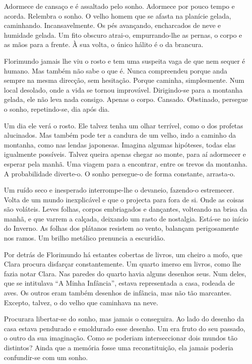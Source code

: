 Adormece de cansaço e é assaltado pelo sonho. Adormece por pouco tempo e
acorda. Relembra o sonho. O velho homem que se afasta na planície
gelada, caminhando. Incansavelmente. Os pés avançando, encharcados de
neve e humidade gelada. Um fito obscuro atrai-o, empurrando-lhe as
pernas, o corpo e as mãos para a frente. À sua volta, o único hálito é o
da brancura.

Florimundo jamais lhe viu o rosto e tem uma suspeita vaga de que nem
sequer é humano. Mas também não sabe o que é. Nunca compreendeu porque
anda sempre na mesma direcção, sem hesitação. Porque caminha,
simplesmente. Num local desolado, onde a vida se tornou improvável.
Dirigindo-se para a montanha gelada, ele não leva nada consigo. Apenas o
corpo. Cansado. Obstinado, persegue o sonho, repetindo-se, dia após dia.

Um dia ele verá o rosto. Ele talvez tenha um olhar terrível, como o dos
profetas alucinados. Mas também pode ter a candura de um velho, indo a
caminho da montanha, como nas lendas japonesas. Imagina algumas
hipóteses, todas elas igualmente possíveis. Talvez queira apenas chegar
ao monte, para aí adormecer e esperar pela manhã. Uma viagem para a
encontrar, entre os trevos da montanha. A probabilidade diverte-o. O
sonho persegue-o de forma constante, arrasta-o.

Um ruído seco e inesperado interrompe-lhe o devaneio, fazendo-o
estremecer. Volta de um mundo inexplicável e que o projecta para fora de
si. Onde as coisas são voláteis. Leves folhas, corpos embriagados e
dançantes, volteando na brisa da manhã, e que varrem a calçada, deixando
um rasto de nostalgia. Está-se no início do Inverno. As folhas dos
plátanos resistem ao vento, balançam perigosamente nos ramos. Um brilho
metálico prenuncia a escuridão.

Por detrás de Florimundo há estantes cobertas de livros, um cheiro a
mofo, que Clara procura disfarçar constantemente. Um quarto imerso em
livros, como lhe fazia notar Clara. Nas paredes do quarto havia alguns
desenhos seus. Num deles, que se intitulava ``A Minha Infância'', estava
representada a casa, rodeada de aves. Os outros eram também desenhos de
infância, mas não tão marcantes. Excepto, talvez, o do velho que
caminhava na neve.

Procurara libertar-se do sonho, mas jamais o conseguira. Ao lado do
desenho da casa estava pendurado e emoldurado esse desenho. Um era fruto
do seu passado, o outro da sua imaginação. Como se poderiam
interseccionar dois mundos tão distintos? Ainda que a memória fosse uma
reconstituição, ela jamais poderia confundir-se com um sonho.

